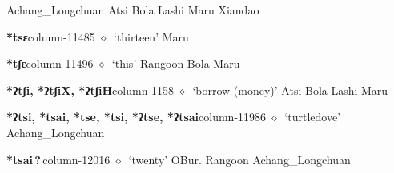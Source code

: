 \hspace{1ex}
         Achang\_Longchuan 
\hspace{1ex}
         Atsi 
\hspace{1ex}
         Bola 
\hspace{1ex}
         Lashi 
\hspace{1ex}
         Maru 
\hspace{1ex}
         Xiandao 
  \item {\footnotesize \textbf{*tsɛ}}{\tiny column-11485}
         $\diamond$~`thirteen'
         Maru 
  \item {\footnotesize \textbf{*tʃɛ}}{\tiny column-11496}
         $\diamond$~`this'
         Rangoon 
\hspace{1ex}
         Bola 
\hspace{1ex}
         Maru 
  \item {\footnotesize \textbf{*ʔtʃi, *ʔtʃiX, *ʔtʃiH}}{\tiny column-1158}
         $\diamond$~`borrow (money)'
         Atsi 
\hspace{1ex}
         Bola 
\hspace{1ex}
         Lashi 
\hspace{1ex}
         Maru 
  \item {\footnotesize \textbf{*ʔtsi, *tsai, *tse, *tsi, *ʔtse, *ʔtsai}}{\tiny column-11986}
         $\diamond$~`turtledove'
         Achang\_Longchuan 
  \item {\footnotesize \textbf{*tsai\,?\,}}{\tiny column-12016}
         $\diamond$~`twenty'
         OBur. 
\hspace{1ex}
         Rangoon 
\hspace{1ex}
         Achang\_Longchuan 

